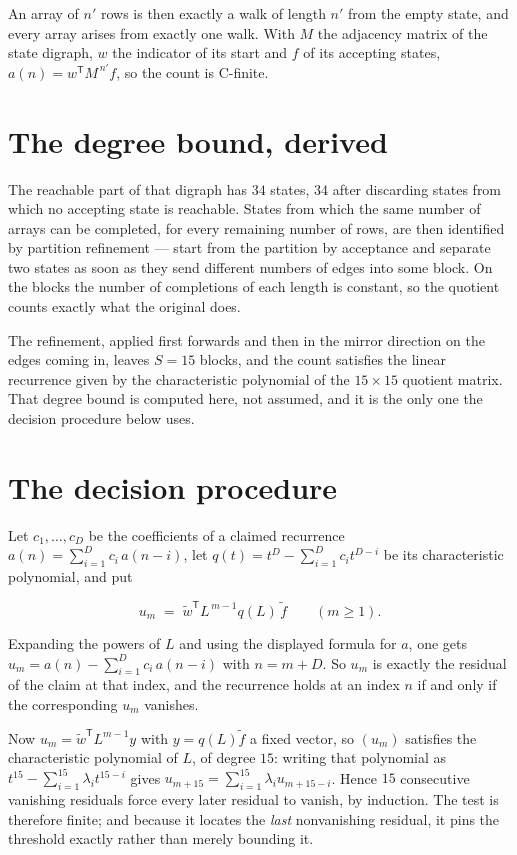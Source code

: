 \documentclass[11pt]{article}
\theoremstyle{definition}
\begin{document}
An array of $n'$ rows is then exactly a walk of length $n'$ from the empty state, and every array arises from exactly one walk. With $M$ the adjacency matrix of the state digraph, $w$ the indicator of its start and $f$ of its accepting states, $a(n) = w^{\mathsf T}M^{\,n'}f$, so the count is C-finite.

\section{The degree bound, derived}

The reachable part of that digraph has $34$ states, $34$ after discarding states from which no accepting state is reachable. States from which the same number of arrays can be completed, for every remaining number of rows, are then identified by partition refinement --- start from the partition by acceptance and separate two states as soon as they send different numbers of edges into some block. On the blocks the number of completions of each length is constant, so the quotient counts exactly what the original does.

The refinement, applied first forwards and then in the mirror direction on the edges coming in, leaves $S = 15$ blocks, and the count satisfies the linear recurrence given by the characteristic polynomial of the $15 \times 15$ quotient matrix. That degree bound is computed here, not assumed, and it is the only one the decision procedure below uses.

\section{The decision procedure}

Let $c_1,\dots,c_D$ be the coefficients of a claimed recurrence $a(n) = \sum_{i=1}^{D} c_i\,a(n-i)$, let $q(t) = t^{D} - \sum_{i=1}^{D} c_i t^{D-i}$ be its characteristic polynomial, and put

\[u_m \;=\; \tilde w^{\mathsf T} L^{\,m-1} q(L)\,\tilde f \qquad (m \ge 1).\]

Expanding the powers of $L$ and using the displayed formula for $a$, one gets $u_m = a(n) - \sum_{i=1}^{D} c_i\,a(n-i)$ with $n = m + D$. So $u_m$ is exactly the residual of the claim at that index, and the recurrence holds at an index $n$ if and only if the corresponding $u_m$ vanishes.

Now $u_m = \tilde w^{\mathsf T} L^{m-1} y$ with $y = q(L)\tilde f$ a fixed vector, so $(u_m)$ satisfies the characteristic polynomial of $L$, of degree $15$: writing that polynomial as $t^{15} - \sum_{i=1}^{15} \lambda_i t^{15-i}$ gives $u_{m+15} = \sum_{i=1}^{15} \lambda_i u_{m+15-i}$. Hence $15$ consecutive vanishing residuals force every later residual to vanish, by induction. The test is therefore finite; and because it locates the {\itshape last} nonvanishing residual, it pins the threshold exactly rather than merely bounding it.
\end{document}
